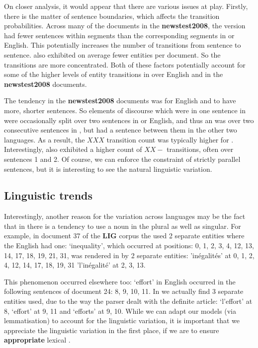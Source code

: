 \documentclass[output=paper]{langsci/langscibook.cls}
\begin{document}
On closer analysis, it would appear that there are various issues at play. Firstly, there is the matter of sentence boundaries, which affects the transition probabilities. Across many of the documents in the {\bf newstest2008}, the  version had fewer sentences within segments than the corresponding segments in  or English. This potentially increases the number of transitions from sentence to sentence.  also exhibited on average fewer entities per document. So the transitions are more concentrated. Both of these factors potentially account for some of the higher levels of entity transitions in  over English and  in the  {\bf newstest2008} documents.

The tendency in the  {\bf newstest2008} documents was for English and  to have more, shorter sentences. So elements of discourse which were in one sentence in  were occasionally split over two sentences in  or English, and thus an  was over two consecutive sentences in , but had a sentence between them in the other two languages. As a result, the $XXX$ transition count was typically higher for . 
Interestingly,  also exhibited a higher count of $XX-$ transitions, often over sentences 1 and 2. Of course, we can enforce the constraint of strictly parallel sentences, but it is interesting to see the natural linguistic variation.

\subsection{Linguistic trends}
Interestingly, another reason for the variation across languages may be the fact that in  there is a tendency to use a noun in the plural as well as singular. For example, in document 37 of the {\bf LIG} corpus the  used 2 separate entities where the English had one: `inequality', which occurred at positions:
0, 1, 2, 3, 4, 12, 13, 14, 17, 18, 19, 21, 31, was rendered in  by 2 separate entities:
'in\'{e}galit\'{e}s' at 0, 1, 2, 4, 12, 14, 17, 18, 19, 31
'l'in\'{e}galit\'{e}' at 2, 3, 13.

This phenomenon occurred elsewhere too: `effort' in English occurred in the following sentences of document 24: 8, 9, 10, 11. In  we actually find 3 separate entities used, due to the way the parser dealt with the definite article:
`l'effort' at 8, `effort' at 9, 11 and `efforts' at 9, 10. While we can adapt our models (via lemmatisation) to account for the linguistic variation, it is important that we appreciate the linguistic variation in the first place, if we are to ensure {\bf appropriate} lexical .
\end{document}
